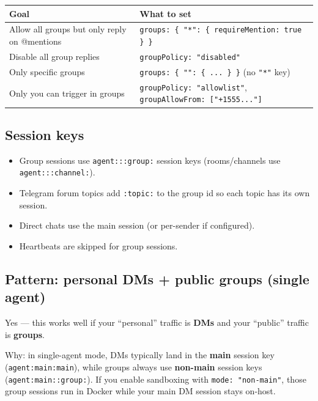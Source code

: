 \begin{table}[h]
\centering
\small
\begin{tabular}{|l|l|}
\hline
Goal & What to set \\
\hline
Allow all groups but only reply on @mentions & \texttt{groups: \{ "*": \{ requireMention: true \} \}} \\
\hline
Disable all group replies & \texttt{groupPolicy: "disabled"} \\
\hline
Only specific groups & \texttt{groups: \{ "": \{ ... \} \}} (no \texttt{"*"} key) \\
\hline
Only you can trigger in groups & \texttt{groupPolicy: "allowlist"}, \texttt{groupAllowFrom: ["+1555..."]} \\
\hline
\end{tabular}
\end{table}



\subsection{Session keys}


\begin{itemize}
  \item Group sessions use \texttt{agent:::group:} session keys (rooms/channels use \texttt{agent:::channel:}).
  \item Telegram forum topics add \texttt{:topic:} to the group id so each topic has its own session.
  \item Direct chats use the main session (or per-sender if configured).
  \item Heartbeats are skipped for group sessions.
\end{itemize}


\subsection{Pattern: personal DMs + public groups (single agent)}


Yes — this works well if your “personal” traffic is \textbf{DMs} and your “public” traffic is \textbf{groups}.

Why: in single-agent mode, DMs typically land in the \textbf{main} session key (\texttt{agent:main:main}), while groups always use \textbf{non-main} session keys (\texttt{agent:main::group:}). If you enable sandboxing with \texttt{mode: "non-main"}, those group sessions run in Docker while your main DM session stays on-host.


